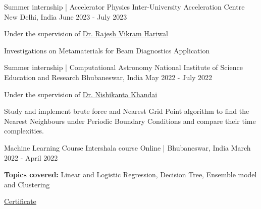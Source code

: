 

\begin{cventries}

	\cventry
	{Summer internship | Accelerator Physics} %
	{Inter-University Acceleration Centre} %
	{New Delhi, India} %
	{June 2023 - July 2023} %
	{
		\begin{cvitems} %
			\item{Under the supervision of \href{https://www.researchgate.net/profile/Dr-Hariwal}{Dr. Rajesh Vikram Hariwal}}
			\item Investigations on Metamaterials for Beam Diagnostics Application
		\end{cvitems}
	}

  	\cventry
    {Summer internship | Computational Astronomy} %
    {National Institute of Science Education and Research} %
    {Bhubaneswar, India} %
    {May 2022 - July 2022} %
    {
      \begin{cvitems} %
      	\item{Under the supervision of \href{https://niser.irins.org/profile/241972}{Dr. Nishikanta Khandai}}
        \item Study and implement brute force and Nearest Grid Point algorithm to find the Nearest Neighbours under Periodic Boundary Conditions and compare their time complexities.
      \end{cvitems}
    }

	\cventry
	{Machine Learning Course} %
	{Intershala course} %
	{Online | Bhubaneswar, India} %
	{March 2022 - April 2022} %
	{
		\begin{cvitems} %
			\item \textbf{Topics covered: } Linear and Logistic Regression, Decision Tree, Ensemble model and Clustering
			\item \href{https://trainings.internshala.com/s/v/883630/29b11593}{Certificate}
		\end{cvitems}
	}

	

	

\end{cventries}
